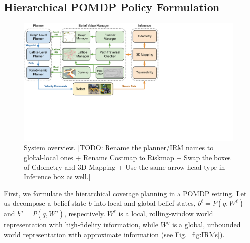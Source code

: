 \documentclass[letterpaper]{article} %
\newcommand{\phdone}[1]{} %
\begin{document}
\subsection{Hierarchical POMDP Policy Formulation}
\label{sec:hierarchical_policy}

\begin{figure}[t!]
  \centering
  \includegraphics[width=.9\columnwidth,trim={0 5.5cm 9.0cm 0},clip]{figures/SystemOverview.pdf}
  \caption{System overview. [TODO: Rename the planner/IRM names to global-local ones + Rename Costmap to Riskmap + Swap the boxes of Odometry and 3D Mapping + Use the same arrow head type in Inference box as well.]}
  \label{fig:system_overview}
\end{figure}


\phdone{Formulation}
First, we formulate the hierarchical coverage planning in a POMDP setting.
%
Let us decompose a belief state $b$ into local and global belief states, $b^\ell = P(q, W^\ell)$ and $b^g = P(q, W^g)$, respectively.
$W^\ell$ is a local, rolling-window world representation with high-fidelity information, while $W^g$ is a global, unbounded world representation with approximate information (see Fig.~\ref{fig:IRMs}).
\end{document}
